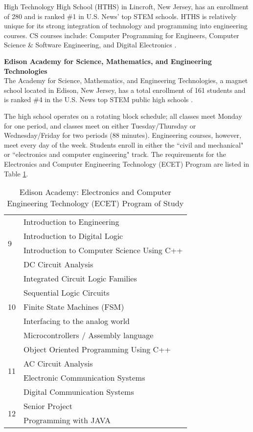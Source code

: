 High Technology High School (HTHS) in Lincroft, New Jersey, has an enrollment of 280 and is ranked \#1 in U.S. News' top STEM schools. HTHS is relatively unique for its strong integration of technology and programming into engineering courses. CS courses include: Computer Programming for Engineers, Computer Science \& Software Engineering, and Digital Electronics \cite{hths}. \par
\textbf{Edison Academy for Science, Mathematics, and Engineering Technologies} \\
The Academy for Science, Mathematics, and Engineering Technologies, a magnet school located in Edison, New Jersey, has a total enrollment of 161 students and is ranked \#4 in the U.S. News top STEM public high schools \cite{usnews}. \par
The high school operates on a rotating block schedule; all classes meet Monday for one period, and classes meet on either Tuesday/Thursday or Wednesday/Friday for two periods (88 minutes). Engineering courses, however, meet every day of the week. Students enroll in either the ``civil and mechanical" or ``electronics and computer engineering" track. The requirements for the Electronics and Computer Engineering Technology (ECET) Program are listed in Table \ref{ecet}. \par
 \begin{table}[]
 \centering
 \caption{Edison Academy: Electronics and Computer Engineering Technology (ECET) Program of Study \cite{edisonacad}}
 \label{ecet}
 \begin{tabular}{|l|l|}
 \hline
 \multirow{4}{*}{9}  & Introduction to Engineering  \\ \cline{2-2} 
                     & Introduction to Digital Logic \\ \cline{2-2} 
                     & Introduction to Computer Science Using C++  \\ \cline{2-2} 
                     & DC Circuit Analysis \\ \hline
 \multirow{5}{*}{10} & Integrated Circuit Logic Families  \\ \cline{2-2} 
                     & Sequential Logic Circuits \\ \cline{2-2} 
                     & Finite State Machines (FSM) \\ \cline{2-2} 
                     & Interfacing to the analog world \\ \cline{2-2} 
                     & Microcontrollers / Assembly language \\ \hline
 \multirow{4}{*}{11} & Object Oriented Programming Using C++  \\ \cline{2-2} 
                     & AC Circuit Analysis \\ \cline{2-2} 
                     & Electronic Communication Systems \\ \cline{2-2} 
                     & Digital Communication Systems \\ \hline
 \multirow{2}{*}{12} & Senior Project \\ \cline{2-2} 
                     & Programming with JAVA \\ \hline
 \end{tabular}
 \end{table}
